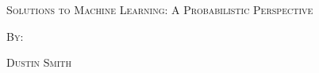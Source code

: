 \documentclass[dvipsnames,svgnames,x11names]{scrbook}%
\begin{document}
%
\pagecolor{PaleGreen1}
\begin{center}
  \begin{center}
  \vspace*{\fill}
  \textsc{\LARGE Solutions to Machine Learning: A Probabilistic Perspective}
  \par\bigskip
  \textsc{By:}
  \par\bigskip
  \textsc{\LARGE Dustin Smith}
  \vspace*{\fill}
\end{center}
\end{center}

\newpage

\tableofcontents

\newpage


\end{document}
